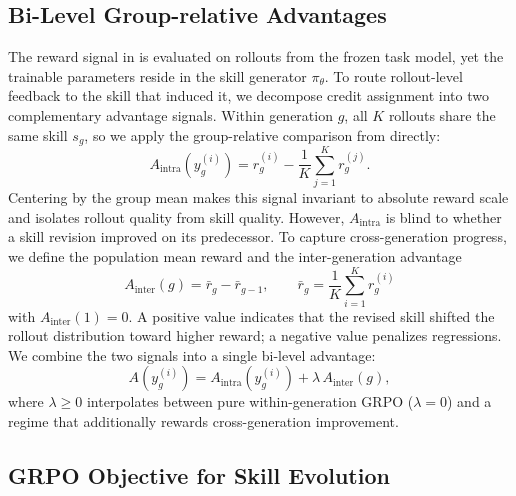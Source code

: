 \subsection{Bi-Level Group-relative Advantages }
\label{sec:method-advantage}

The reward signal in  is evaluated on rollouts from the frozen task model, yet the trainable parameters reside in the skill generator $\pi_\theta$.
To route rollout-level feedback to the skill that induced it, we decompose credit assignment into two complementary advantage signals.
Within generation $g$, all $K$ rollouts share the same skill $s_g$, so we apply the group-relative comparison from  directly:
\begin{equation} \label{eq:intra_adv}
A_{\mathrm{intra}}(y_g^{(i)})
=
r_g^{(i)} - \frac{1}{K}\sum_{j=1}^K r_g^{(j)}.
\end{equation}
Centering by the group mean makes this signal invariant to absolute reward scale and isolates rollout quality from skill quality.
However, $A_{\mathrm{intra}}$ is blind to whether a skill revision improved on its predecessor.
To capture cross-generation progress, we define the population mean reward and the inter-generation advantage
\begin{equation} \label{eq:inter_adv}
A_{\mathrm{inter}}(g) = \bar{r}_g - \bar{r}_{g-1}, \qquad \bar{r}_g = \frac{1}{K}\sum_{i=1}^K r_g^{(i)}
\end{equation}
with $A_{\mathrm{inter}}(1)=0$.
A positive value indicates that the revised skill shifted the rollout distribution toward higher reward; a negative value penalizes regressions.
We combine the two signals into a single bi-level advantage:
\begin{equation}
A(y_g^{(i)}) = A_{\mathrm{intra}}(y_g^{(i)}) + \lambda\, A_{\mathrm{inter}}(g),
\label{eq:bilevel_adv}
\end{equation}
where $\lambda \ge 0$ interpolates between pure within-generation GRPO ($\lambda{=}0$) and a regime that additionally rewards cross-generation improvement.

\subsection{GRPO Objective for Skill Evolution}
\label{sec:method-objective}

